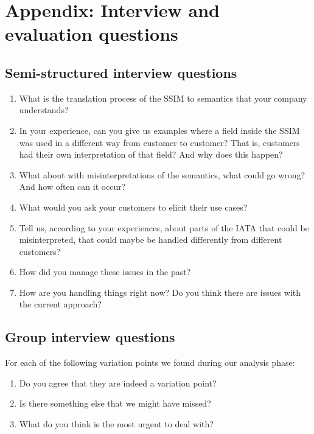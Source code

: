 \section*{Appendix: Interview and evaluation questions}

\subsection*{Semi-structured interview questions} 

 \begin{enumerate}
  \item What is the translation process of the SSIM to semantics that your company understands?
  \item In your experience, can you give us examples where a field inside the SSIM was used in a different way from customer to customer? That is, customers had their own interpretation of that field? And why does this happen?
  
  
  
  
  \item What about with misinterpretations of the semantics, what could go wrong? And how often can it occur?
  \item What would you ask your customers to elicit their use cases?
  \item Tell us, according to your experiences, about parts of the IATA that could be misinterpreted, that could maybe be handled differently from different customers?
  
  \item How did you manage these issues in the past? 
  \item How are you handling things right now? Do you think there are issues with the current approach?

   
 \end{enumerate}



\subsection*{Group interview questions} 

For each of the following variation points we found during our analysis phase: \\

\begin{enumerate}
  \item  Do you agree that they are indeed a variation point?
  \item  Is there something else that we might have missed?
  \item What do you think is the most urgent to deal with? 
  
  
  \end{enumerate}

